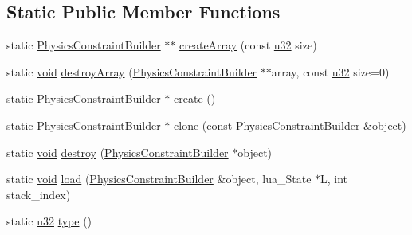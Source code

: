 \subsection*{Static Public Member Functions}
\begin{DoxyCompactItemize}
\item 
static \mbox{\hyperlink{classnjli_1_1_physics_constraint_builder}{Physics\+Constraint\+Builder}} $\ast$$\ast$ \mbox{\hyperlink{classnjli_1_1_physics_constraint_builder_a4a480262ca76e42e7abb72acc1b3f3c4}{create\+Array}} (const \mbox{\hyperlink{_util_8h_a10e94b422ef0c20dcdec20d31a1f5049}{u32}} size)
\item 
static \mbox{\hyperlink{_thread_8h_af1e856da2e658414cb2456cb6f7ebc66}{void}} \mbox{\hyperlink{classnjli_1_1_physics_constraint_builder_a2f170c34503a87f175e1f8ba1f7c5066}{destroy\+Array}} (\mbox{\hyperlink{classnjli_1_1_physics_constraint_builder}{Physics\+Constraint\+Builder}} $\ast$$\ast$array, const \mbox{\hyperlink{_util_8h_a10e94b422ef0c20dcdec20d31a1f5049}{u32}} size=0)
\item 
static \mbox{\hyperlink{classnjli_1_1_physics_constraint_builder}{Physics\+Constraint\+Builder}} $\ast$ \mbox{\hyperlink{classnjli_1_1_physics_constraint_builder_ae1634990857be090fffc4a838eb45581}{create}} ()
\item 
static \mbox{\hyperlink{classnjli_1_1_physics_constraint_builder}{Physics\+Constraint\+Builder}} $\ast$ \mbox{\hyperlink{classnjli_1_1_physics_constraint_builder_af19af90221577409e685cd820a581ffe}{clone}} (const \mbox{\hyperlink{classnjli_1_1_physics_constraint_builder}{Physics\+Constraint\+Builder}} \&object)
\item 
static \mbox{\hyperlink{_thread_8h_af1e856da2e658414cb2456cb6f7ebc66}{void}} \mbox{\hyperlink{classnjli_1_1_physics_constraint_builder_a5edda7adc4b144130a1fbbe2651a0534}{destroy}} (\mbox{\hyperlink{classnjli_1_1_physics_constraint_builder}{Physics\+Constraint\+Builder}} $\ast$object)
\item 
static \mbox{\hyperlink{_thread_8h_af1e856da2e658414cb2456cb6f7ebc66}{void}} \mbox{\hyperlink{classnjli_1_1_physics_constraint_builder_a95693bf5468af4a15f56a69bd350f5f6}{load}} (\mbox{\hyperlink{classnjli_1_1_physics_constraint_builder}{Physics\+Constraint\+Builder}} \&object, lua\+\_\+\+State $\ast$L, int stack\+\_\+index)
\item 
static \mbox{\hyperlink{_util_8h_a10e94b422ef0c20dcdec20d31a1f5049}{u32}} \mbox{\hyperlink{classnjli_1_1_physics_constraint_builder_ab8ad4dfe06ff661fd64efda7ab1666d1}{type}} ()
\end{DoxyCompactItemize}
